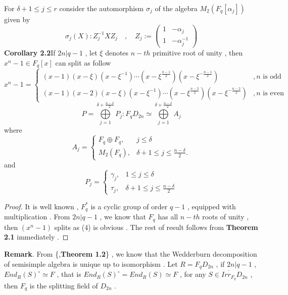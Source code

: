 \documentclass{article}
\begin{document}
For $\delta+1\leq j\leq r$ consider the automorphism $\sigma_j$ of the algebra $M_2(F_q[\alpha_j])$ given by
\begin{equation*}
    \sigma_j(X):Z_j^{-1}XZ_j\quad,\quad Z_j:=\begin{pmatrix}
        1&-\alpha_j\\
        1&-\alpha_j^{-1}
    \end{pmatrix}
\end{equation*}
\textbf{Corollary 2.2}\quad If $2n|q-1$ , let $\xi$ denotes $n-th$ primitive root of unity , then $x^n-1\in{F_q[x]}$ can split as follow
\begin{equation}
x^n-1=\left\{
\begin{array}{ll}
(x-1)(x-\xi)(x-\xi^{-1})\cdots(x-\xi^{\frac{n-1}{2}})(x-\xi^{-\frac{n-1}{2}}) & ,\text{$n$ is odd }  \\
(x-1)(x-2)(x-\xi)(x-\xi^{-1})\cdots(x-\xi^{\frac{n-2}{2}})(x-\xi^{-\frac{n-2}{2}}) & ,\text{$n$ is even} 
\end{array}
\right.
\end{equation}
\begin{equation}
    P=\mathop{\bigoplus}\limits_{j=1}^{\delta+\frac{n-\delta}{2}}P_j:F_qD_{2n}\simeq\mathop{\bigoplus}\limits_{j=1}^{\delta+\frac{n-\delta}{2}}A_j
\end{equation}
where
\begin{equation}
    A_j=\begin{cases}
        F_q\oplus F_q, & j\leq\delta  \\      
        M_2(F_q), & \delta+1\leq j\leq \frac{n-\delta}{2}.
    \end{cases}
\end{equation}
and\\
\begin{equation}
   P_j=\begin{cases}
   \gamma_j, & 1\leq j\leq \delta\\
   \tau_j, & \delta+1\leq j\leq \frac{n-\delta}{2}
   \end{cases}
\end{equation}
\begin{proof}
    It is well known , $F_q^{*}$ is a cyclic group of order $q-1$ , equipped with multiplication . From $2n|q-1$ , we know that $F_q$ has all $n-th$ roots of unity , then $(x^n-1)$ splits as (4) is obvious . The rest of result follows from \textbf{Theorem 2.1} immediately .
\end{proof}
\textbf{Remark}. From \{\cite{bib3},\textbf{Theorem 1.2}\} , we know that the Wedderburn decomposition of semisimple algebra is unique up to isomorphism . Let $R=F_qD_{2n}$ , if $2n|q-1$ ,  ${End_R(S)^{\circ}}\simeq F$ , that is ${End_R(S)^{\circ}}={End_R(S)}\simeq F$ , for any $S\in{\overline{Irr_{F_q}}D_{2n}}$ , then $F_q$ is the splitting field of $D_{2n}$ .
\end{document}
